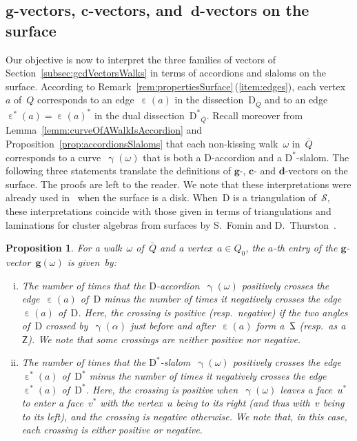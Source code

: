 \documentclass{amsart}
\newtheorem{proposition}[theorem]{Proposition}
\theoremstyle{definition}
\renewcommand{\b}[1]{\mathbf{#1}} %
\newcommand{\surface}{\mathcal{S}} %
\newcommand{\dual}{^*} %
\newcommand{\dissection}{\mathrm{D}} %
\newcommand{\curveof}{\operatorname{\gamma}} %
\newcommand{\edgeof}{\operatorname{\varepsilon}} %
\newcommand{\dualedgeof}{\operatorname{\varepsilon}\dual} %
\DeclareRobustCommand{\SSS}{\reflectbox{$\mathsf{Z}$}} %
\DeclareRobustCommand{\ZZZ}{\mathsf{Z}} %
\newcommand{\gvector}[1]{\mathbf{g}(#1)} %
\begin{document}
\subsection{$\b{g}$-vectors, $\b{c}$-vectors, and~$\b{d}$-vectors on the surface}
\label{subsec:gcdVectorsSurface}

Our objective is now to interpret the three families of vectors of Section~\ref{subsec:gcdVectorsWalks} in terms of accordions and slaloms on the surface.
According to Remark~\ref{rem:propertiesSurface}\,(\eqref{item:edges}), each vertex~$a$ of~$Q$ corresponds to an edge~$\edgeof(a)$ in the dissection~$\dissection_{\bar Q}$ and  to an edge~$\dualedgeof(a) = \edgeof(a)\dual$ in the dual dissection~${\dissection\dual\!\!_{\bar Q}}$.
Recall moreover from Lemma~\ref{lemm:curveOfAWalkIsAccordion} and Proposition~\ref{prop:accordionsSlaloms} that each non-kissing walk~$\omega$ in~$\bar Q$ corresponds to a curve~$\curveof(\omega)$ that is both a $\dissection$-accordion and a $\dissection\dual$-slalom.
The following three statements translate the definitions of $\b{g}$-, $\b{c}$- and $\b{d}$-vectors on the surface.
The proofs are left to the reader.
We note that these interpretations were already used in~\cite{MannevillePilaud-accordion, GarverMcConville} when the surface is a disk.
When~$\dissection$ is a triangulation of~$\surface$, these interpretations coincide with those given in terms of triangulations and laminations for cluster algebras from surfaces by S.~Fomin and D.~Thurston~\cite{FominThurston}.

\begin{proposition}
\label{prop:gVectorsSurface}
For a walk~$\omega$ of~$\bar Q$ and a vertex~$a \in Q_0$, the $a$-th entry of the $\b{g}$-vector~$\gvector{\omega}$ is given~by:
\begin{enumerate}[(i)]
\item The number of times that the $\dissection$-accordion~$\curveof(\omega)$ positively crosses the edge~$\edgeof(a)$ of~$\dissection$ minus the number of times it negatively crosses the edge~$\edgeof(a)$ of~$\dissection$. Here, the crossing is positive (resp.~negative) if the two angles of~$\dissection$ crossed by~$\curveof(\alpha)$ just before and after~$\edgeof(a)$ form a~$\SSS$ (resp.~as a~$\ZZZ$).
We note that some crossings are neither positive nor negative.
\item The number of times that the $\dissection\dual$-slalom~$\curveof(\omega)$ positively crosses the edge~$\dualedgeof(a)$ of~$\dissection\dual$ minus the number of times it negatively crosses the edge~$\dualedgeof(a)$ of~$\dissection\dual$. Here, the crossing is positive when~$\curveof(\omega)$ leaves a face~$u\dual$ to enter a face~$v\dual$ with the vertex~$u$ being to its right (and thus with~$v$ being to its left), and the crossing is negative otherwise.
We note that, in this case, each crossing is either positive or negative.
\end{enumerate}
\end{proposition}
\end{document}
